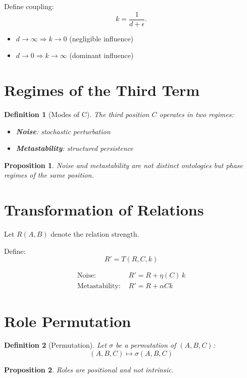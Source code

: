 \documentclass[11pt]{article}
\newtheorem{definition}{Definition}
\newtheorem{proposition}{Proposition}
\begin{document}
Define coupling:
\[
k = \frac{1}{d + \epsilon}.
\]

\begin{itemize}
\item $d \to \infty \Rightarrow k \to 0$ (negligible influence)
\item $d \to 0 \Rightarrow k \to \infty$ (dominant influence)
\end{itemize}

\section{Regimes of the Third Term}

\begin{definition}[Modes of C]
The third position $C$ operates in two regimes:
\begin{itemize}
\item \textbf{Noise}: stochastic perturbation
\item \textbf{Metastability}: structured persistence
\end{itemize}
\end{definition}

\begin{proposition}
Noise and metastability are not distinct ontologies but phase regimes of the same position.
\end{proposition}

\section{Transformation of Relations}

Let $R(A,B)$ denote the relation strength.

Define:
\[
R' = T(R, C, k)
\]

\begin{align*}
\text{Noise: } & R' = R + \eta(C)\,k \\
\text{Metastability: } & R' = R + \alpha C k
\end{align*}

\section{Role Permutation}

\begin{definition}[Permutation]
Let $\sigma$ be a permutation of $(A,B,C)$:
\[
(A,B,C) \mapsto \sigma(A,B,C)
\]
\end{definition}

\begin{proposition}
Roles are positional and not intrinsic.
\end{proposition}
\end{document}

